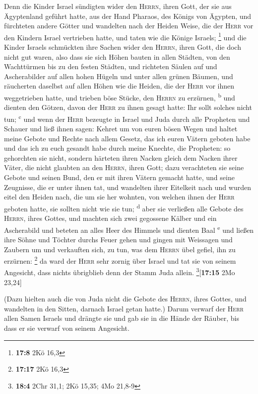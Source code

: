  Denn die Kinder Israel sündigten wider den
\textsc{Herrn}, ihren Gott, der sie aus Ägyptenland geführt hatte, aus
der Hand Pharaos, des Königs von Ägypten, und fürchteten andere Götter
 und wandelten nach der Heiden Weise, die der
\textsc{Herr} vor den Kindern Israel vertrieben hatte, und taten wie die
Könige Israels; \footnote{\textbf{17:8} 2Kö 16,3}  und die
Kinder Israels schmückten ihre Sachen wider den \textsc{Herrn}, ihren
Gott, die doch nicht gut waren, also dass sie sich Höhen bauten in allen
Städten, von den Wachttürmen bis zu den festen Städten, 
und richteten Säulen auf und Ascherabilder auf allen hohen Hügeln und
unter allen grünen Bäumen,  und räucherten daselbst auf
allen Höhen wie die Heiden, die der \textsc{Herr} vor ihnen weggetrieben
hatte, und trieben böse Stücke, den \textsc{Herrn} zu erzürnen,
\textsuperscript{b}  und dienten den Götzen, davon der
\textsc{Herr} zu ihnen gesagt hatte: Ihr sollt solches nicht tun;
\textsuperscript{c}  und wenn der \textsc{Herr} bezeugte
in Israel und Juda durch alle Propheten und Schauer und ließ ihnen
sagen: Kehret um von euren bösen Wegen und haltet meine Gebote und
Rechte nach allem Gesetz, das ich euren Vätern geboten habe und das ich
zu euch gesandt habe durch meine Knechte, die Propheten: 
so gehorchten sie nicht, sondern härteten ihren Nacken gleich dem Nacken
ihrer Väter, die nicht glaubten an den \textsc{Herrn}, ihren Gott;
 dazu verachteten sie seine Gebote und seinen Bund, den
er mit ihren Vätern gemacht hatte, und seine Zeugnisse, die er unter
ihnen tat, und wandelten ihrer Eitelkeit nach und wurden eitel den
Heiden nach, die um sie her wohnten, von welchen ihnen der \textsc{Herr}
geboten hatte, sie sollten nicht wie sie tun; \textsuperscript{d}
 aber sie verließen alle Gebote des \textsc{Herrn}, ihres
Gottes, und machten sich zwei gegossene Kälber und ein Ascherabild und
beteten an alles Heer des Himmels und dienten Baal \textsuperscript{e}
 und ließen ihre Söhne und Töchter durchs Feuer gehen und
gingen mit Weissagen und Zaubern um und verkauften sich, zu tun, was dem
\textsc{Herrn} übel gefiel, ihn zu erzürnen: \footnote{\textbf{17:17}
  2Kö 16,3}  da ward der \textsc{Herr} sehr zornig über
Israel und tat sie von seinem Angesicht, dass nichts übrigblieb denn der
Stamm Juda allein. \footnote{\textbf{18:4} 2Chr 31,1; 2Kö 15,35; 4Mo
  21,8-9}{[}\textbf{17:15} 2Mo 23,24{]}

 (Dazu hielten auch die von Juda nicht die Gebote des
\textsc{Herrn}, ihres Gottes, und wandelten in den Sitten, darnach
Israel getan hatte.)  Darum verwarf der \textsc{Herr}
allen Samen Israels und drängte sie und gab sie in die Hände der Räuber,
bis dass er sie verwarf von seinem Angesicht.

